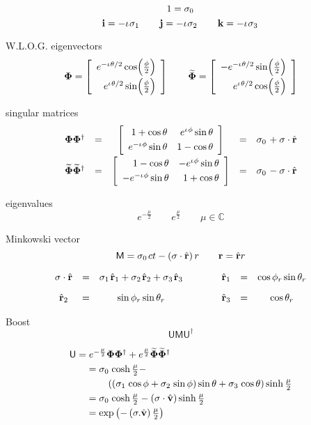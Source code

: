 \documentclass[aps,twocolumn,secnumarabic,nobalancelastpage,amsmath,amssymb,
amsthm,nofootinbib,parskip=full]{revtex4}
\numberwithin{equation}{section}
\newcommand{\spin}[1]{\mathbf{#1}}
\newcommand{\adjoint}[1]{\widetilde{#1}}
\newcommand{\uvector}[1]{\hat{\mathbf{#1}}}
\newcommand{\svector}[2]{\left[\begin{array}{r} #1 \\[5pt]
                                                #2 \end{array}\right]}
\newcommand{\pspinor}[2]
           {\svector{e^{-\iu#2/2}\cos(\frac{#1}{2})}
             {e^{\iu#2/2}\sin(\frac{#1}{2})}}
\newcommand{\apspinor}[2]
           {\svector{-e^{-\iu#2/2}\sin(\frac{#1}{2})}
                    {e^{\iu#2/2}\cos(\frac{#1}{2})}}
\newcommand{\iu}{\iota\mkern1mu}
\newcommand{\pauli}[1]{\sigma_#1\mkern2mu}
\newcommand{\smatrix}[4]{\left[\begin{array}{rr}
                          #1 & #2 \\[3pt] #3 & #4\end{array}\right]}
\newcommand{\qmatrix}[2]
{\smatrix{1+\cos#2}{e^{\iu#1}\sin#2}{e^{-\iu#1}\sin#2}{1-\cos#2}}
\newcommand{\aqmatrix}[2]
{\smatrix{1-\cos#2}{-e^{\iu#1}\sin#2}{-e^{-\iu#1}\sin#2}{1+\cos#2}}
\newcommand{\qv}[1]{\mathbf{\mathsf{#1}}}
\begin{document}
\begin{equation*}
1=\pauli{0}
\end{equation*}
\begin{equation*}
\mathbf{i}=-\iu\pauli{1}\qquad\mathbf{j}=-\iu\pauli{2}\qquad
\mathbf{k}=-\iu\pauli{3}
\end{equation*}

W.L.O.G. eigenvectors
\begin{equation*}
\spin{\Phi}=\pspinor{\phi}{\theta}\qquad
\adjoint{\spin{\Phi}}=\apspinor{\phi}{\theta}
\end{equation*}

singular matrices
\begin{equation*}
\begin{array}{rcccl}
\spin{\Phi}\spin{\Phi}^\dagger&=&\qmatrix{\phi}{\theta}&=&
  \pauli{0}+\sigma\cdot\uvector{r} \\[11pt]
\adjoint{\spin{\Phi}}\adjoint{\spin{\Phi}}^\dagger&=&\aqmatrix{\phi}{\theta}
  &=&\pauli{0}-\sigma\cdot\uvector{r}
\end{array}
\end{equation*}

eigenvalues
\begin{equation*}
e^{-\frac{\mu}{2}}\qquad e^{\frac{\mu}{2}}\qquad\mu\in\mathbb{C}
\end{equation*}

Minkowski vector
\begin{equation*}
\qv{M}=\pauli{0}ct-\left(\sigma\cdot\uvector{r}\right)r\qquad
\mathbf{r}=\uvector{r}r
\end{equation*}

\begin{equation*}
\begin{array}{ccccccc}
\sigma\cdot\uvector{r}&=&
\pauli{1}\uvector{r}_1+\pauli{2}\uvector{r}_2+\pauli{3}\uvector{r}_3&\qquad&
\uvector{r}_1&=&\cos\phi_r\sin\theta_r \\[9pt]
\uvector{r}_2&=&\sin\phi_r\sin\theta_r&\qquad&
\uvector{r}_3&=&\cos\theta_r
\end{array}
\end{equation*}

Boost
\begin{equation*}
\qv{U}\qv{M}\qv{U}^\dagger
\end{equation*}

\begin{equation*}
\begin{array}{l}
\qv{U}=e^{-\frac{\mu}{2}}\spin{\Phi}\spin{\Phi}^\dagger+
e^{\frac{\mu}{2}}\adjoint{\spin{\Phi}}\adjoint{\spin{\Phi}}^\dagger \\[3pt]
\qquad =\pauli{0}\cosh\frac{\mu}{2}- \\[3pt]
\qquad\qquad \left(
\left(\pauli{1}\cos\phi+\pauli{2}\sin\phi\right)\sin\theta+
\pauli{3}\cos\theta\right)\sinh\frac{\mu}{2} \\[3pt]
\qquad =\pauli{0}\cosh\frac{\mu}{2}-
\left(\sigma\cdot\uvector{v}\right)\sinh\frac{\mu}{2} \\[3pt]
\qquad=\exp\left(-\left(\sigma.\uvector{v}\right)\frac{\mu}{2}\right)
\end{array}
\end{equation*}
\end{document}
